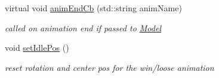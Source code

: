 \begin{DoxyCompactItemize}
virtual void \hyperlink{class_enemy_crispy_a32d938b70f4b0f2bd2e1df606c812d13}{anim\+End\+Cb} (std\+::string anim\+Name)
\begin{DoxyCompactList}\small\item\em called on animation end if passed to \hyperlink{class_model}{Model} \end{DoxyCompactList}\item 
\mbox{\label{class_enemy_crispy_a2608d3b6432576f897e2811aa1324fa2}} 
void \hyperlink{class_enemy_crispy_a2608d3b6432576f897e2811aa1324fa2}{set\+Idle\+Pos} ()
\begin{DoxyCompactList}\small\item\em reset rotation and center pos for the win/loose animation \end{DoxyCompactList}\end{DoxyCompactItemize}
